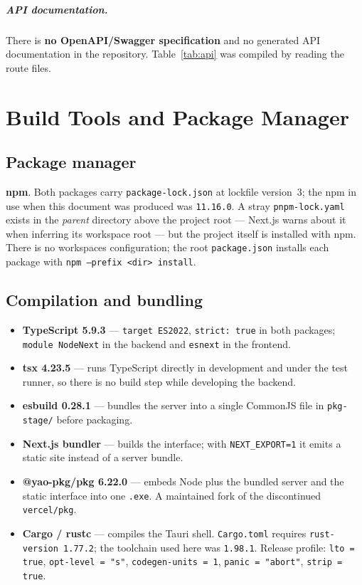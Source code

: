 \documentclass[11pt,a4paper]{report}
\newcommand{\code}[1]{\texttt{\small #1}}
\DeclareRobustCommand{\file}[1]{{\small\nolinkurl{#1}}}
\newcommand{\ver}[1]{\texttt{#1}}
\begin{document}
\paragraph{API documentation.} There is \textbf{no OpenAPI/Swagger specification}
and no generated API documentation in the repository. Table~\ref{tab:api} was
compiled by reading the route files.

\chapter{Build Tools and Package Manager}
\label{sec:build}

\section{Package manager}

\textbf{npm}. Both packages carry \file{package-lock.json} at lockfile version~3;
the npm in use when this document was produced was \ver{11.16.0}. A stray
\file{pnpm-lock.yaml} exists in the \emph{parent} directory above the project
root --- Next.js warns about it when inferring its workspace root --- but the
project itself is installed with npm. There is no workspaces configuration; the
root \file{package.json} installs each package with
\code{npm --prefix <dir> install}.

\section{Compilation and bundling}

\begin{itemize}
\item \textbf{TypeScript 5.9.3} --- \code{target ES2022}, \code{strict: true} in
both packages; \code{module NodeNext} in the backend and \code{esnext} in the
frontend.
\item \textbf{tsx 4.23.5} --- runs TypeScript directly in development and under
the test runner, so there is no build step while developing the backend.
\item \textbf{esbuild 0.28.1} --- bundles the server into a single CommonJS file
in \file{pkg-stage/} before packaging.
\item \textbf{Next.js bundler} --- builds the interface; with
\code{NEXT\_EXPORT=1} it emits a static site instead of a server bundle.
\item \textbf{@yao-pkg/pkg 6.22.0} --- embeds Node plus the bundled server and the
static interface into one \code{.exe}. A maintained fork of the discontinued
\code{vercel/pkg}.
\item \textbf{Cargo / rustc} --- compiles the Tauri shell. \file{Cargo.toml}
requires \code{rust-version 1.77.2}; the toolchain used here was \ver{1.98.1}.
Release profile: \code{lto = true}, \code{opt-level = "s"},
\code{codegen-units = 1}, \code{panic = "abort"}, \code{strip = true}.
\end{itemize}
\end{document}
